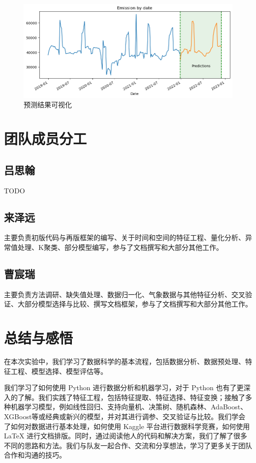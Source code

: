 \documentclass{ctexart}
\begin{document}
\begin{sloppypar}
\begin{figure}[H]
      \centering
      \includegraphics[width=1\textwidth]{output13.png}
      \caption{预测结果可视化}
      \label{fig:13}
\end{figure}

\section{团队成员分工}

\subsection{吕思翰}

TODO

\subsection{来泽远}

主要负责初版代码与再版框架的编写、关于时间和空间的特征工程、量化分析、异常值处理、K聚类、部分模型编写，参与了文档撰写和大部分其他工作。

\subsection{曹宸瑞}

主要负责方法调研、缺失值处理、数据归一化、气象数据与其他特征分析、交叉验证、大部分模型选择与比较、撰写文档框架，参与了文档撰写和大部分其他工作。

\section{总结与感悟}

在本次实验中，我们学习了数据科学的基本流程，包括数据分析、数据预处理、特征工程、模型选择、模型评估等。

我们学习了如何使用 Python 进行数据分析和机器学习，对于 Python 也有了更深入的了解。我们实践了特征工程，包括特征提取、特征选择、特征变换；接触了多种机器学习模型，例如线性回归、支持向量机、决策树、随机森林、AdaBoost、XGBoost等或经典或新兴的模型，并对其进行调参、交叉验证与比较。我们学会了如何对数据进行基本处理，如何使用 Kaggle 平台进行数据科学竞赛，如何使用 \LaTeX{} 进行文档排版。同时，通过阅读他人的代码和解决方案，我们了解了很多不同的思路和方法。我们与队友一起合作、交流和分享想法，学习了更多关于团队合作和沟通的技巧。


\end{sloppypar}
\end{document}
